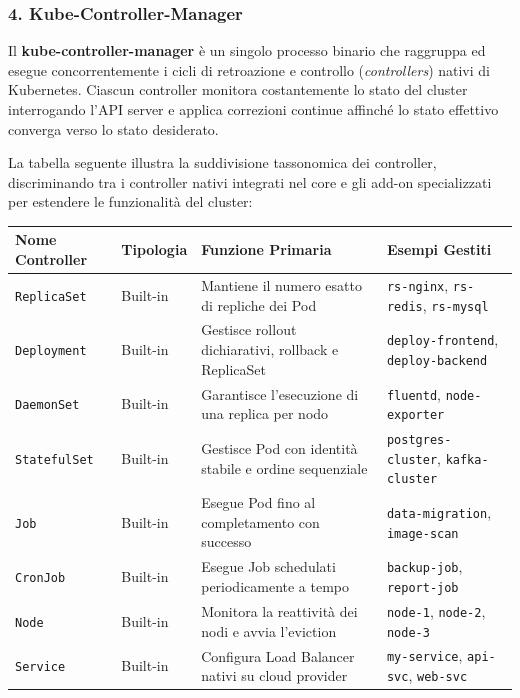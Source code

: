 \documentclass[11pt, a4paper]{article}
\begin{document}
\subsubsection{4. Kube-Controller-Manager}
Il \textbf{kube-controller-manager} è un singolo processo binario che raggruppa ed esegue concorrentemente i cicli di retroazione e controllo (\emph{controllers}) nativi di Kubernetes. Ciascun controller monitora costantemente lo stato del cluster interrogando l'API server e applica correzioni continue affinché lo stato effettivo converga verso lo stato desiderato.

La tabella seguente illustra la suddivisione tassonomica dei controller, discriminando tra i controller nativi integrati nel core e gli add-on specializzati per estendere le funzionalità del cluster:

\begin{table}[H]
\centering
\small
\renewcommand{\arraystretch}{1.2}
\begin{tabularx}{\textwidth}{l p{2.2cm} X p{3.8cm}}
\toprule
\textbf{Nome Controller} & \textbf{Tipologia} & \textbf{Funzione Primaria} & \textbf{Esempi Gestiti} \\
\midrule
\texttt{ReplicaSet} & Built-in & Mantiene il numero esatto di repliche dei Pod & \texttt{rs-nginx}, \texttt{rs-redis}, \texttt{rs-mysql} \\
\texttt{Deployment} & Built-in & Gestisce rollout dichiarativi, rollback e ReplicaSet & \texttt{deploy-frontend}, \texttt{deploy-backend} \\
\texttt{DaemonSet} & Built-in & Garantisce l'esecuzione di una replica per nodo & \texttt{fluentd}, \texttt{node-exporter} \\
\texttt{StatefulSet} & Built-in & Gestisce Pod con identità stabile e ordine sequenziale & \texttt{postgres-cluster}, \texttt{kafka-cluster} \\
\texttt{Job} & Built-in & Esegue Pod fino al completamento con successo & \texttt{data-migration}, \texttt{image-scan} \\
\texttt{CronJob} & Built-in & Esegue Job schedulati periodicamente a tempo & \texttt{backup-job}, \texttt{report-job} \\
\texttt{Node} & Built-in & Monitora la reattività dei nodi e avvia l'eviction & \texttt{node-1}, \texttt{node-2}, \texttt{node-3} \\
\texttt{Service} & Built-in & Configura Load Balancer nativi su cloud provider & \texttt{my-service}, \texttt{api-svc}, \texttt{web-svc} \\

\end{tabularx}
\end{table}
\end{document}
